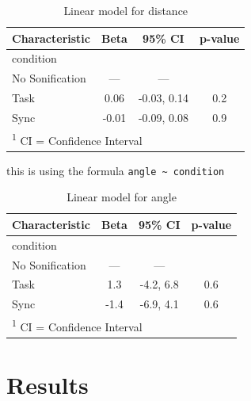 \documentclass[10pt,a4paper,onecolumn]{article}
\begin{document}
\begin{table}

\caption{\label{tab:lm-dist}Linear model for distance}
\centering
\fontsize{7}{9}\selectfont
\begin{tabular}[t]{lccc}
\toprule
\textbf{Characteristic} & \textbf{Beta} & \textbf{95\% CI} & \textbf{p-value}\\
\midrule
condition &  &  & \\
\hspace{1em}No Sonification & — & — & \\
\hspace{1em}Task & 0.06 & -0.03, 0.14 & 0.2\\
\hspace{1em}Sync & -0.01 & -0.09, 0.08 & 0.9\\
\bottomrule
\multicolumn{4}{l}{\rule{0pt}{1em}\textsuperscript{1} CI = Confidence Interval}\\
\end{tabular}
\end{table}

this is using the formula \texttt{angle\ \textasciitilde{}\ condition}

\begin{table}

\caption{\label{tab:lm-ang}Linear model for angle}
\centering
\fontsize{7}{9}\selectfont
\begin{tabular}[t]{lccc}
\toprule
\textbf{Characteristic} & \textbf{Beta} & \textbf{95\% CI} & \textbf{p-value}\\
\midrule
condition &  &  & \\
\hspace{1em}No Sonification & — & — & \\
\hspace{1em}Task & 1.3 & -4.2, 6.8 & 0.6\\
\hspace{1em}Sync & -1.4 & -6.9, 4.1 & 0.6\\
\bottomrule
\multicolumn{4}{l}{\rule{0pt}{1em}\textsuperscript{1} CI = Confidence Interval}\\
\end{tabular}
\end{table}

\hypertarget{results-1}{%
\section{Results}\label{results-1}}
\balance
\clearpage


\printbibliography[title=References,heading=bibintoc]
\end{document}
